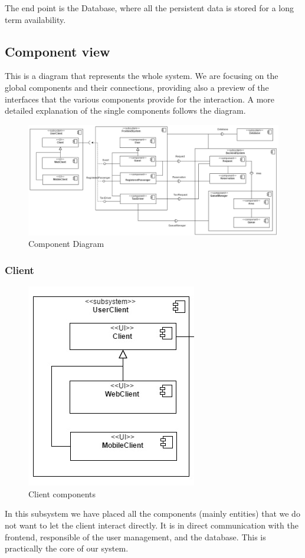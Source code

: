 	The end point is the Database, where all the persistent data is stored for a long term availability.
	\newpage
	\begin{landscape}
	\subsection{Component view}
	This is a diagram that represents the whole system. We are focusing on the global components and their
	connections, providing also a preview of the interfaces that the various components provide for the
	interaction. A more detailed explanation of the single components follows the diagram.
		\begin{figure}[h!]
			\begin{center}
				\includegraphics[width=0.9\linewidth]{../SE2_IMAGES/ComponentDiagram}
				\caption{Component Diagram}
			\end{center}
		\end{figure}
	\end{landscape}
	\newpage
	\subsubsection{Client}
		\begin{figure}[h!]
			\begin{center}
				\includegraphics[scale=1]{../SE2_IMAGES/UserClient}
				\caption{Client components}
			\end{center}
		\end{figure}
		In this subsystem we have placed all the components (mainly entities) that we do not want to let the client
		interact directly. It is in direct communication with the frontend, responsible of the user
		management, and the database. This is practically the core of our system.

